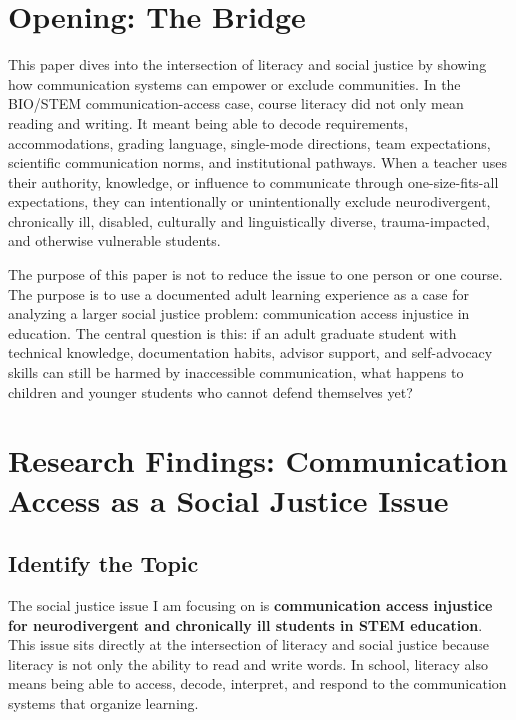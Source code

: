 \section*{Opening: The Bridge}

This paper dives into the intersection of literacy and social justice by showing how communication systems can empower or exclude communities. In the BIO/STEM communication-access case, course literacy did not only mean reading and writing. It meant being able to decode requirements, accommodations, grading language, single-mode directions, team expectations, scientific communication norms, and institutional pathways. When a teacher uses their authority, knowledge, or influence to communicate through one-size-fits-all expectations, they can intentionally or unintentionally exclude neurodivergent, chronically ill, disabled, culturally and linguistically diverse, trauma-impacted, and otherwise vulnerable students.

The purpose of this paper is not to reduce the issue to one person or one course. The purpose is to use a documented adult learning experience as a case for analyzing a larger social justice problem: communication access injustice in education. The central question is this: if an adult graduate student with technical knowledge, documentation habits, advisor support, and self-advocacy skills can still be harmed by inaccessible communication, what happens to children and younger students who cannot defend themselves yet?


\section*{Research Findings: Communication Access as a Social Justice Issue}

\subsection*{Identify the Topic}

The social justice issue I am focusing on is \textbf{communication access injustice for neurodivergent and chronically ill students in STEM education}. This issue sits directly at the intersection of literacy and social justice because literacy is not only the ability to read and write words. In school, literacy also means being able to access, decode, interpret, and respond to the communication systems that organize learning.


